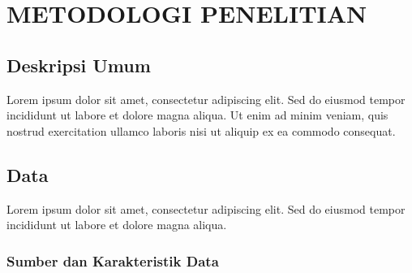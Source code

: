 \chapter{METODOLOGI PENELITIAN}


\section{Deskripsi Umum}


Lorem ipsum dolor sit amet, consectetur adipiscing elit. Sed do eiusmod tempor incididunt ut labore et dolore magna aliqua. Ut enim ad minim veniam, quis nostrud exercitation ullamco laboris nisi ut aliquip ex ea commodo consequat.


\section{Data}


Lorem ipsum dolor sit amet, consectetur adipiscing elit. Sed do eiusmod tempor incididunt ut labore et dolore magna aliqua.

\subsection{Sumber dan Karakteristik Data}

